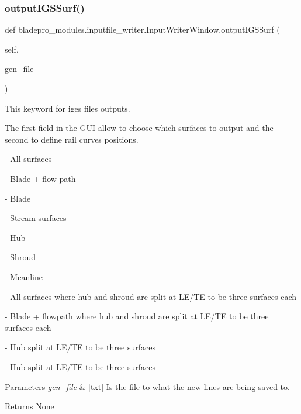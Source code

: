 \subsubsection{\texorpdfstring{output\+I\+G\+S\+Surf()}{outputIGSSurf()}}
{\footnotesize\ttfamily def bladepro\+\_\+modules.\+inputfile\+\_\+writer.\+Input\+Writer\+Window.\+output\+I\+G\+S\+Surf (\begin{DoxyParamCaption}\item[{}]{self,  }\item[{}]{gen\+\_\+file }\end{DoxyParamCaption})}



This keyword for iges files outputs. 

The first field in the G\+UI allow to choose which surfaces to output and the second to define rail curves positions.

\begin{DoxyItemize}
\item {} -\/ All surfaces \item {} -\/ Blade + flow path \item {} -\/ Blade \item {} -\/ Stream surfaces \item {} -\/ Hub \item {} -\/ Shroud \item {} -\/ Meanline \item {} -\/ All surfaces where hub and shroud are split at L\+E/\+TE to be three surfaces each \item {} -\/ Blade + flowpath where hub and shroud are split at L\+E/\+TE to be three surfaces each \item {} -\/ Hub split at L\+E/\+TE to be three surfaces \item {} -\/ Hub split at L\+E/\+TE to be three surfaces\end{DoxyItemize}

\begin{DoxyParams}{Parameters}
{\em gen\+\_\+file} & \mbox{[}txt\mbox{]} Is the file to what the new lines are being saved to. \\
\hline
\end{DoxyParams}
\begin{DoxyReturn}{Returns}
None 
\end{DoxyReturn}
\hypertarget{classbladepro__modules_1_1inputfile__writer_1_1_input_writer_window_ae5847a1434bc82a396cebfb20911db56}{}\label{classbladepro__modules_1_1inputfile__writer_1_1_input_writer_window_ae5847a1434bc82a396cebfb20911db56} 
